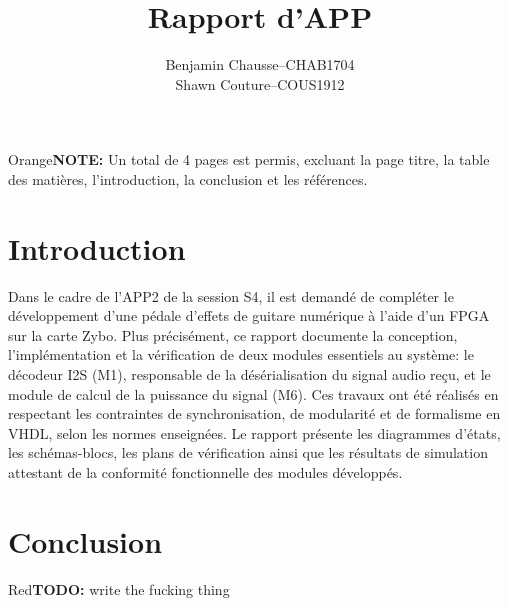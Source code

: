 \documentclass[a11paper]{article}
\title{Rapport d'APP}
\author{
  \addtolength{\tabcolsep}{-0.4em}
  \begin{tabular}{rcl} %
      Benjamin Chausse & -- & CHAB1704 \\
      Shawn Couture    & -- & COUS1912 \\
  \end{tabular}
}
\newcommand{\todo}[1]{\begin{color}{Red}\textbf{TODO:} #1\end{color}}
\newcommand{\note}[1]{\begin{color}{Orange}\textbf{NOTE:} #1\end{color}}
\begin{document}
\maketitle
\newpage
\tableofcontents
\newpage

\note{Un total de 4 pages est permis, excluant la page titre, la table des matières, l'introduction,
la conclusion et les références.}

\section{Introduction}

Dans le cadre de l'APP2 de la session S4, il est demandé de compléter le
développement d'une pédale d'effets de guitare numérique à l'aide d'un FPGA
sur la carte Zybo. Plus précisément, ce rapport documente la conception,
l'implémentation et la vérification de deux modules essentiels au système:
le décodeur I2S (M1), responsable de la désérialisation du signal audio reçu,
et le module de calcul de la puissance du signal (M6). Ces travaux ont été
réalisés en respectant les contraintes de synchronisation, de modularité et
de formalisme en VHDL, selon les normes enseignées. Le rapport présente les
diagrammes d'états, les schémas-blocs, les plans de vérification ainsi que
les résultats de simulation attestant de la conformité fonctionnelle des
modules développés.




\section{Conclusion}
\todo{write the fucking thing}
\end{document}
